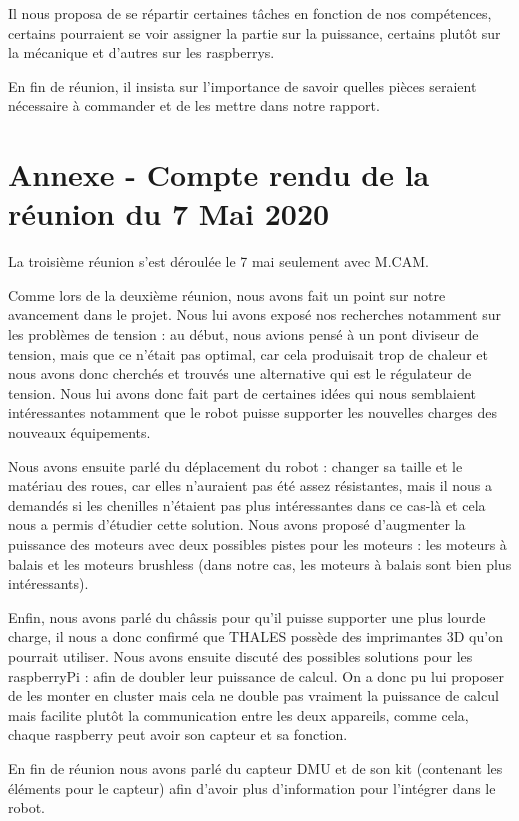 \documentclass{PackagerQualityN}
\begin{document}
Il nous proposa de se répartir certaines tâches en fonction de nos compétences, certains pourraient
se voir assigner la partie sur la puissance, certains plutôt sur la mécanique et d'autres sur les
raspberrys.


En fin de réunion, il insista sur l'importance de savoir quelles pièces seraient nécessaire à
commander et de les mettre dans notre rapport.
\newp
\section{Annexe - Compte rendu de la réunion du 7 Mai 2020}
La troisième réunion s'est déroulée le 7 mai seulement avec M.CAM.

Comme lors de la deuxième réunion, nous avons fait un point sur notre avancement dans le projet.
Nous lui avons exposé nos recherches notamment sur les problèmes de tension : au début, nous
avions pensé à un pont diviseur de tension, mais que ce n'était pas optimal, car cela produisait trop
de chaleur et nous avons donc cherchés et trouvés une alternative qui est le régulateur de tension.
Nous lui avons donc fait part de certaines idées qui nous semblaient intéressantes notamment que le robot puisse supporter les nouvelles charges des nouveaux équipements.


Nous avons ensuite parlé du déplacement du robot : changer sa taille et le matériau des roues, car
elles n'auraient pas été assez résistantes, mais il nous a demandés si les chenilles n'étaient pas plus
intéressantes dans ce cas-là et cela nous a permis d'étudier cette solution.
Nous avons proposé d'augmenter la puissance des moteurs avec deux possibles pistes pour les
moteurs : les moteurs à balais et les moteurs brushless (dans notre cas, les moteurs à balais sont bien
plus intéressants).


Enfin, nous avons parlé du châssis pour qu’il puisse supporter une plus lourde charge, il nous a
donc confirmé que THALES possède des imprimantes 3D qu’on pourrait utiliser.
Nous avons ensuite discuté des possibles solutions pour les raspberryPi : afin de doubler leur
puissance de calcul. On a donc pu lui proposer de les monter en cluster mais cela ne double pas
vraiment la puissance de calcul mais facilite plutôt la communication entre les deux appareils,
comme cela, chaque raspberry peut avoir son capteur et sa fonction.


En fin de réunion nous avons parlé du capteur DMU et de son kit (contenant les éléments pour le
capteur) afin d’avoir plus d’information pour l'intégrer dans le robot.
\newp
\end{document}
